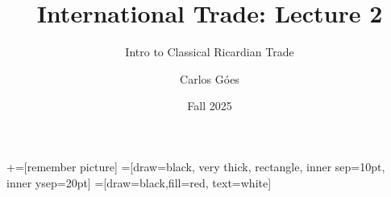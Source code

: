 \documentclass[notes,11pt, aspectratio=169, xcolor=table]{beamer}
\title[]{International Trade: Lecture 2}
\subtitle[]{Intro to Classical Ricardian Trade}
\author[Góes]
{Carlos Góes\inst{1}}
\date{Fall 2025}
\institute[GWU]{\inst{1} George Washington University }
\begin{document}
\newcommand\marktopleft[1]{%
    \tikz[overlay,remember picture] 
        \node (marker-#1-a) at (-.3em,.3em) {};%
}
\newcommand\markbottomright[2]{%
    \tikz[overlay,remember picture] 
        \node (marker-#1-b) at (0em,0em) {};%
}
+=[remember picture] 
 =[draw=black, very thick, rectangle, inner sep=10pt, inner ysep=20pt]
 =[draw=black,fill=red, text=white]















\frame{\titlepage}
\addtocounter{framenumber}{-1}



\end{document}
